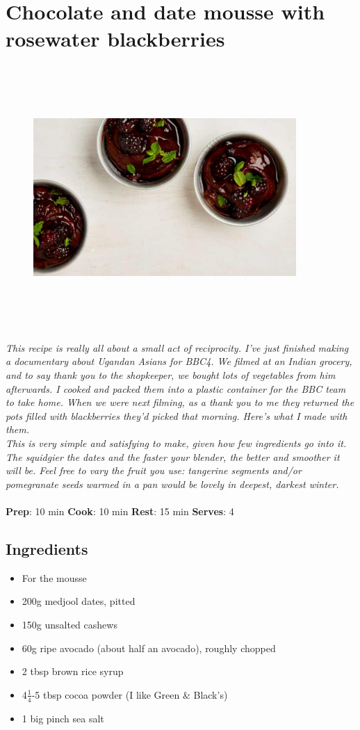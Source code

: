 \documentclass{book}
\begin{document}
\section{Chocolate and date mousse with rosewater blackberries}
\begin{figure}
\centering\includegraphics[width=10cm,height=10cm,keepaspectratio]{Recipe_Pictures/Chocolate_and_date_mousse_with_rosewater_blackberries.png}
\end{figure}
\emph{This recipe is really all about a small act of reciprocity. I’ve just finished making a documentary about Ugandan Asians for BBC4. We filmed at an Indian grocery, and to say thank you to the shopkeeper, we bought lots of vegetables from him afterwards. I cooked and packed them into a plastic container for the BBC team to take home. When we were next filming, as a thank you to me they returned the pots filled with blackberries they’d picked that morning. Here’s what I made with them.\\ 
This is very simple and satisfying to make, given how few ingredients go into it. The squidgier the dates and the faster your blender, the better and smoother it will be. Feel free to vary the fruit you use: tangerine segments and/or pomegranate seeds warmed in a pan would be lovely in deepest, darkest winter.}\\\\ 
\textbf{Prep}: 10 min
\textbf{Cook}: 10 min
\textbf{Rest}: 15 min
\textbf{Serves}: 4
\subsection*{Ingredients}
\begin{itemize}
\item For the mousse
\item 200g medjool dates, pitted 
\item 150g unsalted cashews 
\item 60g ripe avocado (about half an avocado), roughly chopped
\item 2 tbsp brown rice syrup 
\item 4$\frac{1}{4}$-5 tbsp cocoa powder (I like Green \& Black’s) 
\item 1 big pinch sea salt
\end{itemize}
\end{document}
